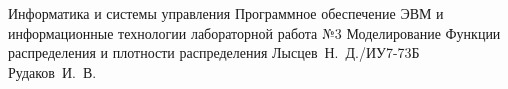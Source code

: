 \documentclass{bmstu}
\begin{document}
\makereporttitle
{Информатика и системы управления} %
{Программное обеспечение ЭВМ и информационные технологии}
{лабораторной работа №3} %
{Моделирование} %
{Функции распределения и плотности распределения} %
{} %
{Лысцев~Н.~Д./ИУ7-73Б} %
{Рудаков~И.~В.} %
{}

\maketableofcontents

%


%
%
%

\end{document}

